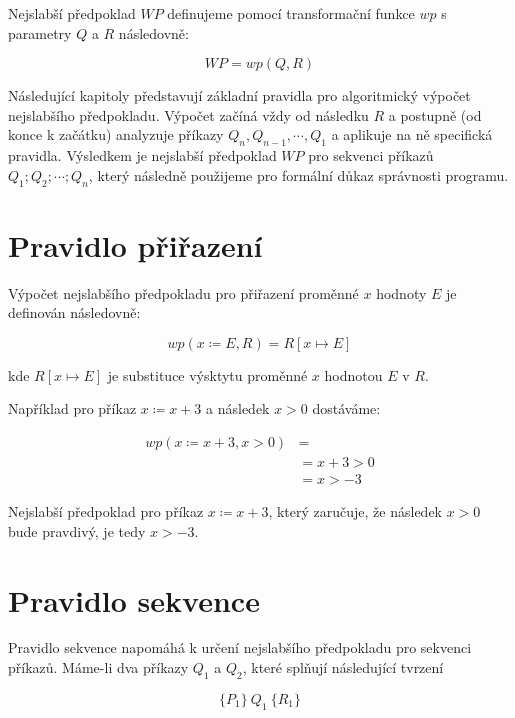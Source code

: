 Nejslabší předpoklad $WP$ definujeme pomocí transformační funkce $wp$
s parametry $Q$ a $R$ následovně:

\begin{equation*}
    WP = wp(Q, R)
\end{equation*}

Následující kapitoly představují základní pravidla pro algoritmický výpočet nejslabšího předpokladu.
Výpočet začíná vždy od následku $R$ a postupně (od konce k začátku)
analyzuje příkazy $Q_n, Q_{n-1}, \cdots, Q_1$ a aplikuje na ně specifická pravidla.
Výsledkem je nejslabší předpoklad $WP$ pro sekvenci příkazů $Q_1; Q_2; \cdots; Q_n$,
který následně použijeme pro formální důkaz správnosti programu.

\section{Pravidlo přiřazení}
\label{sec:pravidlo-prirazeni}

Výpočet nejslabšího předpokladu pro přiřazení proměnné $x$ hodnoty $E$ je
definován následovně:

\begin{equation*}
    wp(x \coloneqq E, R) = R[x \mapsto E]
\end{equation*}

kde $R[x \mapsto E]$ je substituce výsktytu proměnné $x$ hodnotou $E$ v $R$.

Například pro příkaz $x \coloneqq x + 3$ a následek $x > 0$ dostáváme:

\begin{align*}
    wp(x \coloneqq x + 3, x > 0) & = \\
                                 & = x + 3 > 0 \\
                                 & = x > -3
\end{align*}

Nejslabší předpoklad pro příkaz $x \coloneqq x + 3$, který zaručuje, že
následek $x > 0$ bude pravdivý, je tedy $x > -3$.

\section{Pravidlo sekvence}
\label{sec:pravidlo-sekvence}

Pravidlo sekvence napomáhá k určení nejslabšího předpokladu pro sekvenci příkazů.
Máme-li dva příkazy $Q_1$ a $Q_2$, které splňují následující tvrzení

\begin{equation*}
    \{ P_1 \} \  Q_1 \  \{ R_1 \}
\end{equation*}

